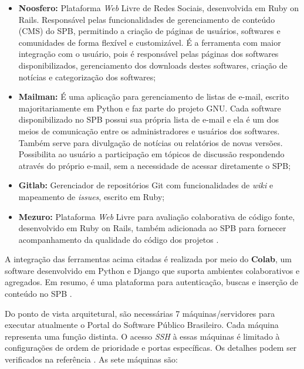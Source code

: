 \begin{itemize}
  \item \textbf{Noosfero:} Plataforma \textit{Web} Livre de Redes Sociais, desenvolvida
	em Ruby on Rails. Responsável pelas funcionalidades de gerenciamento de
	conteúdo (CMS) do SPB, permitindo a criação de páginas de usuários, softwares
	e comunidades de forma flexível e customizável. É a ferramenta com maior
	integração com o usuário, pois é responsável pelas páginas dos softwares
	disponibilizados, gerenciamento dos downloads destes softwares, criação de
	notícias e categorização dos softwares;
  \item \textbf{Mailman:} É uma aplicação para gerenciamento de listas de
	e-mail, escrito majoritariamente em Python e faz parte do projeto GNU. Cada
	software disponibilizado no SPB possui sua própria lista de e-mail e ela é um
	dos meios de comunicação entre os administradores e usuários dos softwares.
	Também serve para divulgação de notícias ou relatórios de novas versões.
	Possibilita ao usuário a participação em tópicos de discussão respondendo
	através do próprio e-mail, sem a necessidade de acessar diretamente o SPB;
	\item \textbf{Gitlab:} Gerenciador de repositórios Git com funcionalidades de
	\textit{wiki} e mapeamento de \textit{issues}, escrito em Ruby;
	\item \textbf{Mezuro:} Plataforma \textit{Web} Livre para avaliação colaborativa de
	código fonte, desenvolvido em Ruby on Rails, também adicionada ao SPB para
	fornecer acompanhamento da qualidade do código dos projetos \cite{aboutSPB}.
\end{itemize}

A integração das ferramentas acima citadas é realizada por meio do
\textbf{Colab}, um software desenvolvido em Python e Django que suporta
ambientes colaborativos e agregados. Em resumo, é uma plataforma para
autenticação, buscas e inserção de conteúdo no SPB \cite{aboutSPB}.

Do ponto de vista arquitetural, são necessárias 7 máquinas/servidores para
executar atualmente o Portal do
Software Público Brasileiro. Cada máquina representa uma função distinta. O
acesso \textit{SSH} à essas máquinas é limitado à configurações de ordem de
prioridade e portas específicas. Os detalhes podem ser verificados na
referência \cite{archSPB}. As sete máquinas são:

